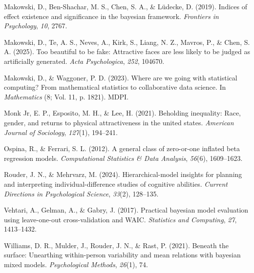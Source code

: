 \documentclass[
  jou,
  floatsintext,
  longtable,
  nolmodern,
  notxfonts,
  notimes,
  colorlinks=true,linkcolor=blue,citecolor=blue,urlcolor=blue]{apa7}
\newlength{\cslhangindent}
\newenvironment{CSLReferences}[2] %
 {\begin{list}{}{%
  \setlength{\itemindent}{0pt}
  \setlength{\leftmargin}{0pt}
  \setlength{\parsep}{0pt}
  \ifodd #1
   \setlength{\leftmargin}{\cslhangindent}
   \setlength{\itemindent}{-1\cslhangindent}
  \fi
  \setlength{\itemsep}{#2\baselineskip}}}
 {\end{list}}
\begin{document}
\begin{CSLReferences}{1}{0}
Makowski, D., Ben-Shachar, M. S., Chen, S. A., \& Lüdecke, D. (2019).
Indices of effect existence and significance in the bayesian framework.
\emph{Frontiers in Psychology}, \emph{10}, 2767.

Makowski, D., Te, A. S., Neves, A., Kirk, S., Liang, N. Z., Mavros, P.,
\& Chen, S. A. (2025). Too beautiful to be fake: Attractive faces are
less likely to be judged as artificially generated. \emph{Acta
Psychologica}, \emph{252}, 104670.

Makowski, D., \& Waggoner, P. D. (2023). Where are we going with
statistical computing? From mathematical statistics to collaborative
data science. In \emph{Mathematics} (8; Vol. 11, p. 1821). MDPI.

Monk Jr, E. P., Esposito, M. H., \& Lee, H. (2021). Beholding
inequality: Race, gender, and returns to physical attractiveness in the
united states. \emph{American Journal of Sociology}, \emph{127}(1),
194--241.

Ospina, R., \& Ferrari, S. L. (2012). A general class of zero-or-one
inflated beta regression models. \emph{Computational Statistics \& Data
Analysis}, \emph{56}(6), 1609--1623.

Rouder, J. N., \& Mehrvarz, M. (2024). Hierarchical-model insights for
planning and interpreting individual-difference studies of cognitive
abilities. \emph{Current Directions in Psychological Science},
\emph{33}(2), 128--135.

Vehtari, A., Gelman, A., \& Gabry, J. (2017). Practical bayesian model
evaluation using leave-one-out cross-validation and WAIC.
\emph{Statistics and Computing}, \emph{27}, 1413--1432.

Williams, D. R., Mulder, J., Rouder, J. N., \& Rast, P. (2021). Beneath
the surface: Unearthing within-person variability and mean relations
with bayesian mixed models. \emph{Psychological Methods}, \emph{26}(1),
74.

\end{CSLReferences}
\end{document}
